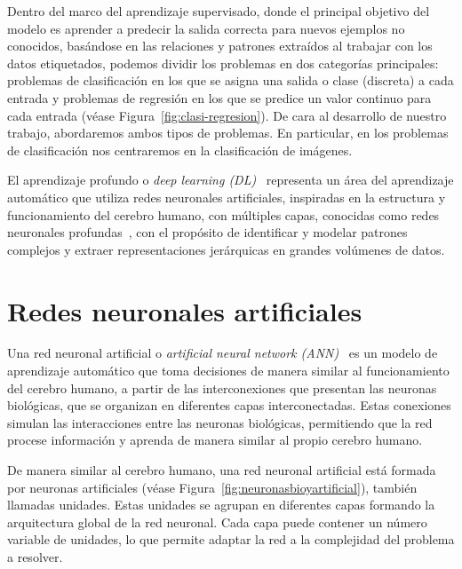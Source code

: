 Dentro del marco del aprendizaje supervisado, donde el principal objetivo del modelo es aprender a predecir la salida correcta para nuevos ejemplos no conocidos, basándose en las relaciones y patrones extraídos al trabajar con los datos etiquetados, podemos dividir los problemas en dos categorías principales: problemas de clasificación en los que se asigna una salida o clase (discreta) a cada entrada y problemas de regresión en los que se predice un valor continuo para cada entrada (véase Figura~\ref{fig:clasi-regresion}). De cara al desarrollo de nuestro trabajo, abordaremos ambos tipos de problemas. En particular, en los problemas de clasificación nos centraremos en la clasificación de imágenes.

El aprendizaje profundo o \emph{deep learning (DL)}~\cite{Bishop2023, Prince2023, LeCun2015} representa un área del aprendizaje automático que utiliza redes neuronales artificiales, inspiradas en la estructura y funcionamiento del cerebro humano, con múltiples capas, conocidas como redes neuronales profundas~\cite{Goodfellow2016, Schmidhuber2015}, con el propósito de identificar y modelar patrones complejos y extraer representaciones jerárquicas en grandes volúmenes de datos.

\section{Redes neuronales artificiales}\label{sec:redes-neuronales-artificiales}

Una red neuronal artificial o \emph{artificial neural network (ANN)}~\cite{Bishop1995, Ripley1996} es un modelo de aprendizaje automático que toma decisiones de manera similar al funcionamiento del cerebro humano, a partir de las interconexiones que presentan las neuronas biológicas, que se organizan en diferentes capas interconectadas. Estas conexiones simulan las interacciones entre las neuronas biológicas, permitiendo que la red procese información y aprenda de manera similar al propio cerebro humano.

De manera similar al cerebro humano, una red neuronal artificial está formada por neuronas artificiales (véase Figura~\ref{fig:neuronasbioyartificial}), también llamadas unidades. Estas unidades se agrupan en diferentes capas formando la arquitectura global de la red neuronal. Cada capa puede contener un número variable de unidades, lo que permite adaptar la red a la complejidad del problema a resolver.

